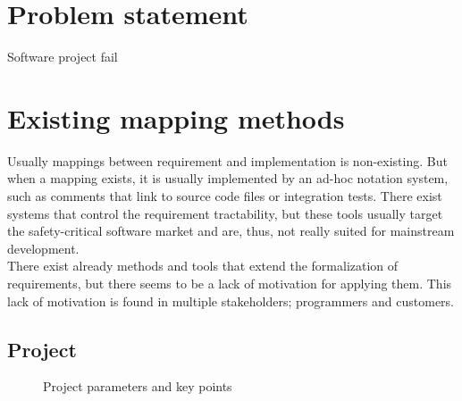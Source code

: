 \section{Problem statement}
Software project fail \cite{verner2008} \cite{charette2005}
\section{Existing mapping methods}
Usually mappings between requirement and implementation is non-existing. But when a mapping exists, it is usually implemented by an ad-hoc notation system, such as comments that link to source code files or integration tests. There exist systems that control the requirement tractability, but these tools usually target the safety-critical software market and are, thus, not really suited for mainstream development.\\%

There exist already methods and tools that extend the formalization of requirements, but there seems to be a lack of motivation for applying them. This lack of motivation is found in multiple stakeholders; programmers and customers.

\subsection{Project}
\begin{figure}
\centering
{}
\label{fig:project_parameter_plot}
\caption{Project parameters and key points}
\end{figure}

